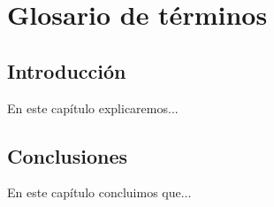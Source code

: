 \chapter{Glosario de términos}\label{cap:terminos}

\section{Introducción}
En este capítulo explicaremos...

\section{Conclusiones}
En este capítulo concluimos que...